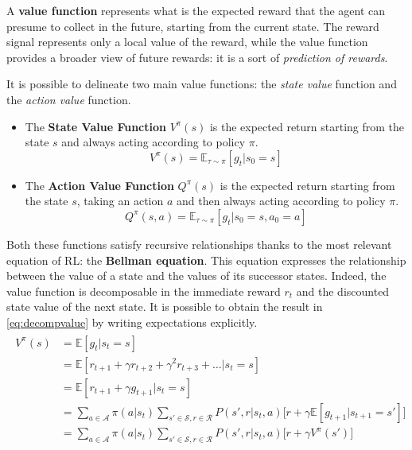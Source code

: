 A \textbf{value function} represents what is the expected reward that the agent can presume to collect in the future, starting from the current state. The reward signal represents only a local value of the reward, while the value function provides a broader view of future rewards: it is a sort of \textit{prediction of rewards}.

It is possible to delineate two main value functions: the \textit{state value} function and the \textit{action value} function.

\begin{itemize}
	\item The \textbf{State Value Function} $V^\pi(s)$ is the expected return starting from the state $s$ and always acting according to policy $\pi$.
	\begin{equation} \label{eq:statevalue}
		V^\pi(s) = \mathbb{E}_{\tau \sim \pi}[g_t | s_0 = s]
	\end{equation}
	\item The \textbf{Action Value Function} $Q^\pi(s)$ is the expected return starting from the state $s$, taking an action $a$ and then always acting according to policy $\pi$.
	\begin{equation} \label{eq:actionvalue}
	Q^\pi(s, a) = \mathbb{E}_{\tau \sim \pi}[g_t | s_0 = s, a_0 = a]
	\end{equation}
\end{itemize}

Both these functions satisfy recursive relationships thanks to the most relevant equation of RL: the \textbf{Bellman equation}.
This equation expresses the relationship between the value of a state and the values of its successor states. Indeed, the value function is decomposable in the immediate reward $r_t$ and the discounted state value of the next state. It is possible to obtain the result in \vref{eq:decompvalue} by writing expectations explicitly.
\begin{align}\label{eq:decompvalue}
	\begin{split}
	V^\pi(s) &= \mathbb{E}[g_t | s_t = s] \\
	&= \mathbb{E}[r_{t+1} + \gamma r_{t+2} + \gamma^2 r_{t+3} + \dots | s_t = s] \\
	&= \mathbb{E}[r_{t+1} + \gamma g_{t+1} | s_t = s] \\
	&= \sum_{a \in \mathcal{A}}\pi(a|s_t)\sum_{s' \in \mathcal{S}, r \in \mathcal{R}}P(s', r | s_t, a)\big[r + \gamma\mathbb{E}[g_{t+1}| s_{t+1} = s']\big]\\
	&= \sum_{a \in \mathcal{A}}\pi(a|s_t)\sum_{s' \in \mathcal{S}, r \in \mathcal{R}}P(s', r | s_t, a)\big[r + \gamma V^\pi(s')\big]
	\end{split}
\end{align}

